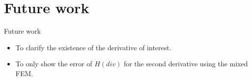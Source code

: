 \documentclass{beamer}
\begin{document}

\section{Future work}
\begin{frame}{Future work}
\vspace{-10em}
\begin{itemize}
 \item To clarify the existence of the derivative of interest.
 \item To only show the error of $H(div)$ for the second derivative using the mixed FEM.
\end{itemize}
\end{frame}



\end{document}

